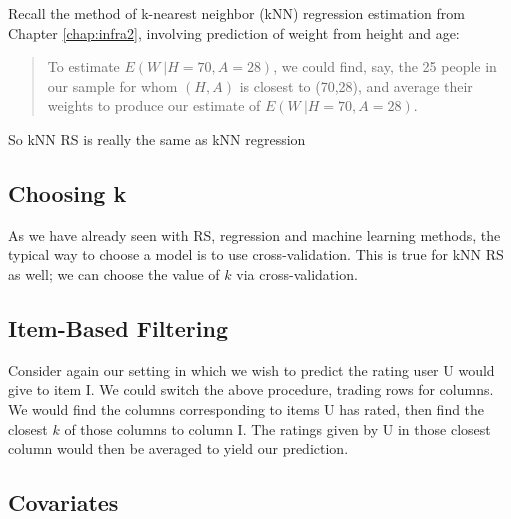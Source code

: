 Recall the method of k-nearest neighbor (kNN) regression estimation from
Chapter \ref{chap:infra2}, involving prediction of weight from height
and age:

\begin{quote}
To estimate $E(W ~| H=70, A=28)$, we could find, say, the 25 people in our
sample for whom $(H,A)$ is closest to (70,28), and average their weights
to produce our estimate of $E(W ~| H=70, A=28)$.
\end{quote}

So kNN RS is really the same as kNN regression

\subsection{Choosing k}

As we have already seen with RS, regression and machine learning methods, 
the typical way to choose a model is to use cross-validation.  This is
true for kNN RS as well; we can choose the value of $k$ via
cross-validation.  

% 
% 
% 

\subsection{Item-Based Filtering}

Consider again our setting in which we wish to predict the rating user U
would give to item I.  We could switch the above procedure, trading rows
for columns.  We would find the columns corresponding to items U has
rated, then find the closest $k$ of those columns to column I.  The
ratings given by U in those closest column would then be averaged to
yield our prediction.

\subsection{Covariates}

